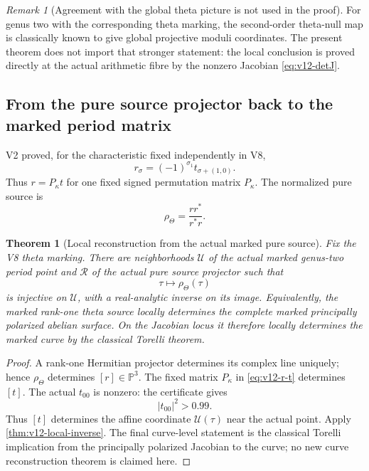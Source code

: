 \documentclass[11pt]{article}
\newtheorem{theorem}{Theorem}[section]
\theoremstyle{definition}
\theoremstyle{remark}
\newtheorem{remark}[remark]{Remark}
\begin{document}
\begin{remark}[Agreement with the global theta picture is not used in the proof]
For genus two with the corresponding theta marking, the second-order theta-null
map is classically known to give global projective moduli coordinates.  The
present theorem does not import that stronger statement: the local conclusion
is proved directly at the actual arithmetic fibre by the nonzero Jacobian
\cref{eq:v12-detJ}.
\end{remark}

\subsection{From the pure source projector back to the marked period matrix}
V2 proved, for the characteristic fixed independently in V8,
\begin{equation}
 r_\sigma=(-1)^{\sigma_1}
 t_{\sigma+(1,0)}.
 \label{eq:v12-r-t}
\end{equation}
Thus \(r=P_\kappa t\) for one fixed signed permutation matrix
\(P_\kappa\).  The normalized pure source is
\[
 \rho_\Theta=\frac{rr^*}{r^*r}.
\]

\begin{theorem}[Local reconstruction from the actual marked pure source]
\label{thm:v12-source-reconstruction}
Fix the V8 theta marking.  There are neighborhoods \(\mathscr U\) of the
actual marked genus-two period point and \(\mathscr R\) of the actual pure
source projector such that
\begin{equation}
 \boxed{
 \tau\longmapsto\rho_\Theta(\tau)
 }
 \label{eq:v12-source-map}
\end{equation}
is injective on \(\mathscr U\), with a real-analytic inverse on its image.
Equivalently, the marked rank-one theta source locally determines the complete
marked principally polarized abelian surface.  On the Jacobian locus it
therefore locally determines the marked curve by the classical Torelli theorem.
\end{theorem}
\begin{proof}
A rank-one Hermitian projector determines its complex line uniquely; hence
\(\rho_\Theta\) determines \([r]\in\mathbb P^3\).  The fixed matrix
\(P_\kappa\) in \cref{eq:v12-r-t} determines \([t]\).  The actual
\(t_{00}\) is nonzero: the certificate gives
\[
 |t_{00}|^2>0.99.
\]
Thus \([t]\) determines the affine coordinate \(\mathcal U(\tau)\) near the
actual point.  Apply \cref{thm:v12-local-inverse}.  The final curve-level
statement is the classical Torelli implication from the principally polarized
Jacobian to the curve; no new curve reconstruction theorem is claimed here.
\end{proof}
\end{document}
